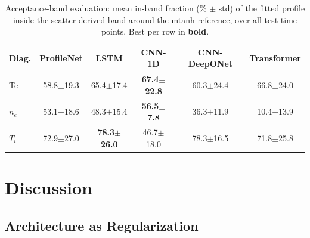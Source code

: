 \documentclass[a4paper,12pt]{article}
\begin{document}
\begin{table}[htbp]
\centering\footnotesize
\caption{Acceptance-band evaluation: mean in-band fraction (\% $\pm$ std) of the fitted profile inside the scatter-derived band around the mtanh reference, over all test time points. Best per row in \textbf{bold}.}
\label{tab:band}
\begin{tabular}{l c c c c c}
\toprule
\textbf{Diag.} & \textbf{ProfileNet} & \textbf{LSTM} & \textbf{CNN-1D} & \textbf{CNN-DeepONet} & \textbf{Transformer} \\
\midrule
Te & 58.8$\pm$19.3 & 65.4$\pm$17.4 & \textbf{67.4$\pm$22.8} & 60.3$\pm$24.4 & 66.8$\pm$24.0 \\
$n_e$ & 53.1$\pm$18.6 & 48.3$\pm$15.4 & \textbf{56.5$\pm$7.8} & 36.3$\pm$11.9 & 10.4$\pm$13.9 \\
$T_i$ & 72.9$\pm$27.0 & \textbf{78.3$\pm$26.0} & 46.7$\pm$18.0 & 78.3$\pm$16.5 & 71.8$\pm$25.8 \\
\bottomrule
\end{tabular}
\end{table}

\section{Discussion}

\subsection{Architecture as Regularization}
\end{document}

